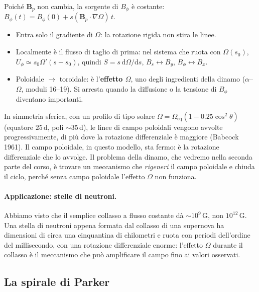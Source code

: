 Poiché $\mathbf{B}_p$ non cambia, la sorgente di $B_\phi$ è costante: $B_\phi(t)=B_\phi(0)+s(\mathbf{B}_p\cdot\nabla\Omega)\,t$.
\begin{itemize}
\item Entra solo il gradiente di $\Omega$: la rotazione rigida non stira le linee.
\item Localmente è il flusso di taglio di prima: nel sistema che ruota con $\Omega(s_0)$, $U_\phi\simeq s_0\Omega'(s-s_0)$, quindi $S=s\,\mathrm{d}\Omega/\mathrm{d}s$, $B_s\leftrightarrow B_y$, $B_\phi\leftrightarrow B_x$.
\item Poloidale $\to$ toroidale: è l'\textbf{effetto $\Omega$}, uno degli ingredienti della dinamo ($\alpha$--$\Omega$, moduli 16--19). Si arresta quando la diffusione o la tensione di $B_\phi$ diventano importanti.
\end{itemize}

In simmetria sferica, con un profilo di tipo solare $\Omega=\Omega_{\mathrm{eq}}(1-0.25\cos^2\theta)$ (equatore $25\,$d, poli $\sim35\,$d), le linee di campo poloidali vengono avvolte progressivamente, di più dove la rotazione differenziale è maggiore (Babcock 1961). Il campo poloidale, in questo modello, sta fermo: è la rotazione differenziale che lo avvolge. Il problema della dinamo, che vedremo nella seconda parte del corso, è trovare un meccanismo che \emph{rigeneri} il campo poloidale e chiuda il ciclo, perché senza campo poloidale l'effetto $\Omega$ non funziona.

\paragraph{Applicazione: stelle di neutroni.} Abbiamo visto che il semplice collasso a flusso costante dà $\sim10^9\,$G, non $10^{12}\,$G. Una stella di neutroni appena formata dal collasso di una supernova ha dimensioni di circa una cinquantina di chilometri e ruota con periodi dell'ordine del millisecondo, con una rotazione differenziale enorme: l'effetto $\Omega$ durante il collasso è il meccanismo che può amplificare il campo fino ai valori osservati.

\subsection{La spirale di Parker}


